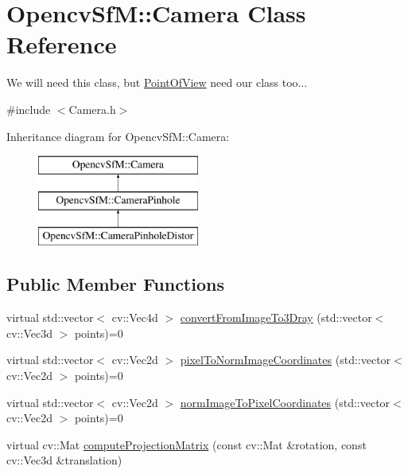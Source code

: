 \hypertarget{class_opencv_sf_m_1_1_camera}{
\section{OpencvSfM::Camera Class Reference}
\label{class_opencv_sf_m_1_1_camera}
}


We will need this class, but \hyperlink{class_opencv_sf_m_1_1_point_of_view}{PointOfView} need our class too...  




{\ttfamily \#include $<$Camera.h$>$}

Inheritance diagram for OpencvSfM::Camera:\begin{figure}[H]
\begin{center}
\leavevmode
\includegraphics[height=3.000000cm]{class_opencv_sf_m_1_1_camera}
\end{center}
\end{figure}
\subsection*{Public Member Functions}
\begin{DoxyCompactItemize}
\item 
virtual std::vector$<$ cv::Vec4d $>$ \hyperlink{class_opencv_sf_m_1_1_camera_aa1b338f09e0139185d71bf82e1807cb7}{convertFromImageTo3Dray} (std::vector$<$ cv::Vec3d $>$ points)=0
\item 
virtual std::vector$<$ cv::Vec2d $>$ \hyperlink{class_opencv_sf_m_1_1_camera_a9dde477a85f86e076c79d3ce01b5f974}{pixelToNormImageCoordinates} (std::vector$<$ cv::Vec2d $>$ points)=0
\item 
virtual std::vector$<$ cv::Vec2d $>$ \hyperlink{class_opencv_sf_m_1_1_camera_aaea15041e74b4a4246b533aa67d86e4b}{normImageToPixelCoordinates} (std::vector$<$ cv::Vec2d $>$ points)=0
\item 
virtual cv::Mat \hyperlink{class_opencv_sf_m_1_1_camera_af5fa11b3438e4f70a339c101cebbc16d}{computeProjectionMatrix} (const cv::Mat \&rotation, const cv::Vec3d \&translation)
\end{DoxyCompactItemize}
